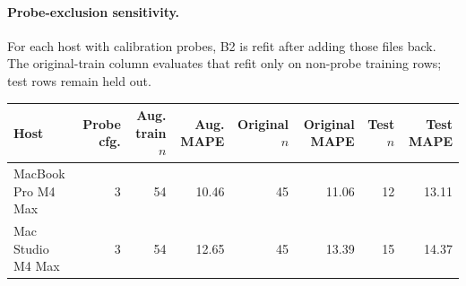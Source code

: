 \documentclass[10pt]{article}
\begin{document}
\paragraph{Probe-exclusion sensitivity.}
For each host with calibration probes, B2 is refit after adding those files back. The original-train column evaluates that refit only on non-probe training rows; test rows remain held out.
\begin{center}
\small
\setlength{\tabcolsep}{3.0pt}
\begin{tabular}{lrrrrrrr}
\toprule
Host & Probe cfg. & Aug. train $n$ & Aug. MAPE & Original $n$ & Original MAPE & Test $n$ & Test MAPE\\
\midrule
MacBook Pro M4 Max & 3 & 54 & 10.46 & 45 & 11.06 & 12 & 13.11 \\
Mac Studio M4 Max & 3 & 54 & 12.65 & 45 & 13.39 & 15 & 14.37 \\
\bottomrule
\end{tabular}
\end{center}
\end{document}
